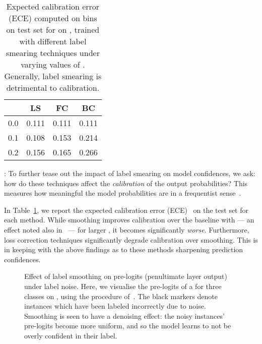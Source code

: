 \begin{table}[!t]
    \centering
    


{
    \begin{tabular}{@{}lccc@{}}
        \toprule
        \multicolumn{1}{c}{\textbf{}} & \textbf{LS} & \multicolumn{1}{c}{\textbf{FC}} & \multicolumn{1}{c}{\textbf{BC}}\\
        \toprule
        0.0 & 0.111 & 0.111 & 0.111 \\ 
        0.1 & 0.108 & 0.153 & 0.214 \\ 
        0.2 & 0.156 & 0.165 & 0.266 \\ 
        \bottomrule
    \end{tabular}
    }
    
    \caption{Expected calibration error (ECE) computed on  bins on test set
    for \resnetT{} on \cifarH{}, trained with different label smearing techniques under varying values of .
Generally, label smearing is detrimental to calibration.}
    \label{tbl:ece}
\end{table}

:
To further tease out the impact of label smearing on model confidences,
we ask:
how do these techniques affect the \emph{calibration} of the output probabilities?
This measures how meaningful the model probabilities are in a frequentist sense~\citep{Dawid:1982}.

In Table~\ref{tbl:ece}, we report
the expected calibration error (ECE)~\citep{Guo:2017}
on the test set for each method. 
While smoothing improves calibration over the baseline with 
--- an effect noted also in~\cite{Muller:2019} ---
for larger , it becomes significantly \emph{worse}.
Furthermore, loss correction techniques significantly degrade calibration over smoothing.
This is in keeping with the above findings as to these methods sharpening prediction confidences.

\begin{figure*}[!t]
    \centering
    \caption{Effect of label smoothing on pre-logits (penultimate layer output) under label noise.
    Here, we visualise the pre-logits of a \resnetT{} for three classes on \cifarH{}, using the procedure of~\citet{Muller:2019}.
    The black markers denote instances which have been labeled incorrectly due to noise.
    Smoothing is seen to have a denoising effect: the noisy instances' pre-logits become more uniform, and so the model learns to not be overly confident in their label.}
    \label{fig:smoothing_logits}
\end{figure*}

